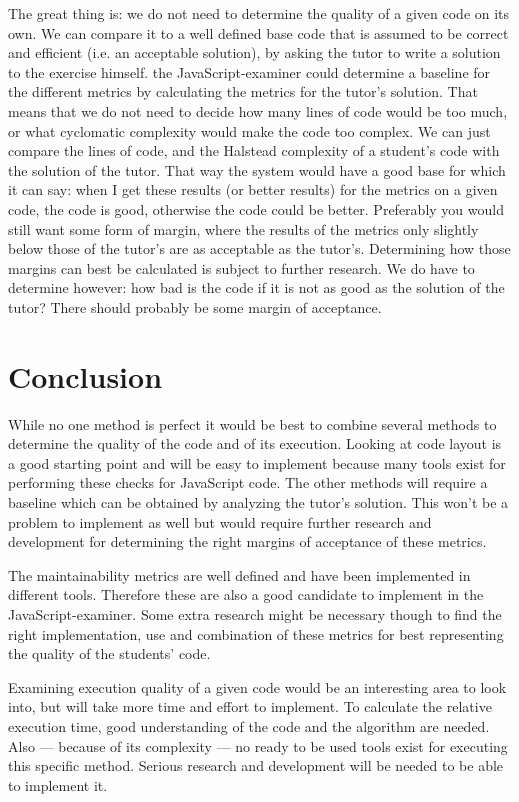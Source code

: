 The great thing is: we do not need to determine the quality of a given code
on its own. We can compare it to a well defined base code that is assumed to be
correct and efficient (i.e. an acceptable solution),
by asking the tutor to write a solution to the exercise himself.
the JavaScript-examiner could determine a baseline for the different metrics
by calculating the metrics for the tutor's solution.
That means that we do not
need to decide how many lines of code would be too much, or what cyclomatic
complexity would make the code too complex. We can just compare the lines of
code, and the Halstead complexity of a student's code with the solution of the
tutor.
That way the system would have a good base for which it can say:
when I get these results (or better results) for the metrics on a given
code, the code is good, otherwise the code could be better. Preferably you
would still want some form of margin, where the results of the metrics only
slightly below those of the tutor's are as acceptable as the
tutor's. Determining how those margins can best be calculated is subject to
further research.
We do have to determine however: how bad is the code if it is not as
good as the solution of the tutor? There should probably be some margin of
acceptance.


\section{Conclusion}

While no one method is perfect it would be best to combine several methods to
determine the quality of the code and of its execution. Looking at code layout
is a good starting point and will be easy to implement because many tools exist
for performing these checks for JavaScript code. The other methods will require
a baseline which can be obtained by analyzing the tutor's solution. This won't
be a problem to implement as well but would require further research and
development for determining the right margins of acceptance of these metrics.

The maintainability metrics are well defined and have been implemented in
different tools. Therefore these are also a good candidate to implement in
the JavaScript-examiner. Some extra research might be necessary though to find
the right implementation, use and combination of these metrics for best
representing the quality of the students' code.

Examining execution quality of a given code would be an interesting area to
look into, but will take more time and effort to implement. To calculate the
relative execution time, good understanding of the code and the algorithm are
needed. Also --- because of its complexity --- no ready to be used tools exist
for executing this specific method. Serious research and development will be
needed to be able to implement it.


